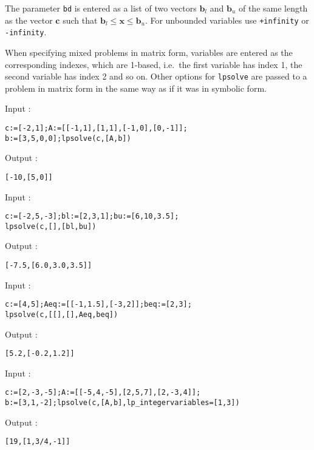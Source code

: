 \documentclass[a4paper,11pt]{book}
\begin{document}
The parameter {\tt bd} is entered as a list of two vectors $ \mathbf{b}_l $ and $ \mathbf{b}_u $ of the same length as the vector $ \mathbf{c} $ such that $ \mathbf{b}_l\leq\mathbf{x}\leq\mathbf{b}_u $. For unbounded variables use {\tt +infinity} or {\tt -infinity}.

When specifying mixed problems in matrix form, variables are entered as the corresponding indexes, which are 1-based, i.e.~the first variable has index 1, the second variable has index 2 and so on. Other options for {\tt lpsolve} are passed to a problem in matrix form in the same way as if it was in symbolic form.

\noindent Input :
\begin{center}
{\tt c:=[-2,1];A:=[[-1,1],[1,1],[-1,0],[0,-1]];}\\
{\tt b:=[3,5,0,0];lpsolve(c,[A,b])}
\end{center}
Output :
\begin{center}
{\tt [-10,[5,0]]}
\end{center}
Input :
\begin{center}
{\tt c:=[-2,5,-3];bl:=[2,3,1];bu:=[6,10,3.5];}\\
{\tt lpsolve(c,[],[bl,bu])}
\end{center}
Output :
\begin{center}
{\tt [-7.5,[6.0,3.0,3.5]]}
\end{center}
Input :
\begin{center}
{\tt c:=[4,5];Aeq:=[[-1,1.5],[-3,2]];beq:=[2,3];}\\
{\tt lpsolve(c,[[],[],Aeq,beq])}
\end{center}
Output :
\begin{center}
{\tt [5.2,[-0.2,1.2]]}
\end{center}
Input :
\begin{center}
{\tt c:=[2,-3,-5];A:=[[-5,4,-5],[2,5,7],[2,-3,4]];}\\
{\tt b:=[3,1,-2];lpsolve(c,[A,b],lp\_integervariables=[1,3])}
\end{center}
Output :
\begin{center}
{\tt [19,[1,3/4,-1]]}
\end{center}
\end{document}
